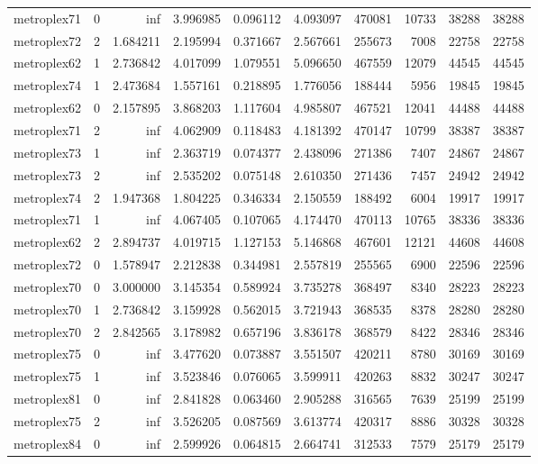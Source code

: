 \begin{longtable}{|l|r|r|r|r|r|r|r|r|r|}
metroplex71 & 0 & inf & 3.996985 & 0.096112 & 4.093097 & 470081 & 10733 & 38288 & 38288 \\
metroplex72 & 2 & 1.684211 & 2.195994 & 0.371667 & 2.567661 & 255673 & 7008 & 22758 & 22758 \\
metroplex62 & 1 & 2.736842 & 4.017099 & 1.079551 & 5.096650 & 467559 & 12079 & 44545 & 44545 \\
metroplex74 & 1 & 2.473684 & 1.557161 & 0.218895 & 1.776056 & 188444 & 5956 & 19845 & 19845 \\
metroplex62 & 0 & 2.157895 & 3.868203 & 1.117604 & 4.985807 & 467521 & 12041 & 44488 & 44488 \\
metroplex71 & 2 & inf & 4.062909 & 0.118483 & 4.181392 & 470147 & 10799 & 38387 & 38387 \\
metroplex73 & 1 & inf & 2.363719 & 0.074377 & 2.438096 & 271386 & 7407 & 24867 & 24867 \\
metroplex73 & 2 & inf & 2.535202 & 0.075148 & 2.610350 & 271436 & 7457 & 24942 & 24942 \\
metroplex74 & 2 & 1.947368 & 1.804225 & 0.346334 & 2.150559 & 188492 & 6004 & 19917 & 19917 \\
metroplex71 & 1 & inf & 4.067405 & 0.107065 & 4.174470 & 470113 & 10765 & 38336 & 38336 \\
metroplex62 & 2 & 2.894737 & 4.019715 & 1.127153 & 5.146868 & 467601 & 12121 & 44608 & 44608 \\
metroplex72 & 0 & 1.578947 & 2.212838 & 0.344981 & 2.557819 & 255565 & 6900 & 22596 & 22596 \\
metroplex70 & 0 & 3.000000 & 3.145354 & 0.589924 & 3.735278 & 368497 & 8340 & 28223 & 28223 \\
metroplex70 & 1 & 2.736842 & 3.159928 & 0.562015 & 3.721943 & 368535 & 8378 & 28280 & 28280 \\
metroplex70 & 2 & 2.842565 & 3.178982 & 0.657196 & 3.836178 & 368579 & 8422 & 28346 & 28346 \\
metroplex75 & 0 & inf & 3.477620 & 0.073887 & 3.551507 & 420211 & 8780 & 30169 & 30169 \\
metroplex75 & 1 & inf & 3.523846 & 0.076065 & 3.599911 & 420263 & 8832 & 30247 & 30247 \\
metroplex81 & 0 & inf & 2.841828 & 0.063460 & 2.905288 & 316565 & 7639 & 25199 & 25199 \\
metroplex75 & 2 & inf & 3.526205 & 0.087569 & 3.613774 & 420317 & 8886 & 30328 & 30328 \\
metroplex84 & 0 & inf & 2.599926 & 0.064815 & 2.664741 & 312533 & 7579 & 25179 & 25179 \\

\end{longtable}
